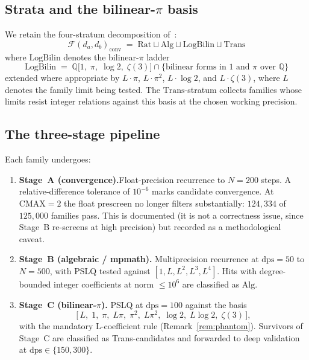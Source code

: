 \documentclass[11pt,a4paper]{amsart}
\theoremstyle{definition}
\theoremstyle{remark}
\newcommand{\FF}{\mathcal{F}}
\newcommand{\Rat}{\mathrm{Rat}}
\newcommand{\Alg}{\mathrm{Alg}}
\newcommand{\Trans}{\mathrm{Trans}}
\newcommand{\dps}{\mathrm{dps}}
\begin{document}
\subsection{Strata and the bilinear-$\pi$ basis}

We retain the four-stratum decomposition of~\cite{PCF24}:
\[
  \FF(d_a,d_b)_{\mathrm{conv}}
  \;=\; \Rat \sqcup \Alg \sqcup \mathrm{LogBilin} \sqcup \Trans
\]
where $\mathrm{LogBilin}$ denotes the bilinear-$\pi$ ladder
\[
  \mathrm{LogBilin} \;=\;
  \mathbb{Q}\bigl[1,\;\pi,\;\log 2,\;\zeta(3)\bigr]
  \cap \{\text{bilinear forms in $1$ and $\pi$ over $\mathbb{Q}$}\}
\]
extended where appropriate by $L\cdot\pi$, $L\cdot\pi^2$, $L\cdot\log 2$,
and $L\cdot\zeta(3)$, where $L$ denotes the family limit being tested.
The $\Trans$-stratum collects families whose limits resist integer
relations against this basis at the chosen working precision.

\subsection{The three-stage pipeline}

Each family undergoes:

\begin{enumerate}
\item \textbf{Stage~A (convergence).}\quad Float-precision recurrence to
$N=200$ steps.  A relative-difference tolerance of $10^{-6}$ marks
candidate convergence.  At $\mathrm{CMAX}=2$ the float prescreen no
longer filters substantially: $124{,}334$ of $125{,}000$ families pass.
This is documented (it is not a correctness issue, since Stage~B
re-screens at high precision) but recorded as a methodological caveat.

\item \textbf{Stage~B (algebraic / mpmath).}\quad
Multiprecision recurrence at $\dps=50$ to $N=500$, with PSLQ tested
against $[1,L,L^2,L^3,L^4]$.  Hits with degree-bounded integer
coefficients at norm $\le 10^{6}$ are classified as $\Alg$.

\item \textbf{Stage~C (bilinear-$\pi$).}\quad
PSLQ at $\dps=100$ against the basis
\[
  \bigl[\,L,\;1,\;\pi,\;L\pi,\;\pi^2,\;L\pi^2,\;\log 2,\;L\log 2,\;\zeta(3)\,\bigr],
\]
with the mandatory L-coefficient rule (Remark~\ref{rem:phantom}).
Survivors of Stage~C are classified as Trans-candidates and forwarded
to deep validation at $\dps \in \{150, 300\}$.
\end{enumerate}
\end{document}
